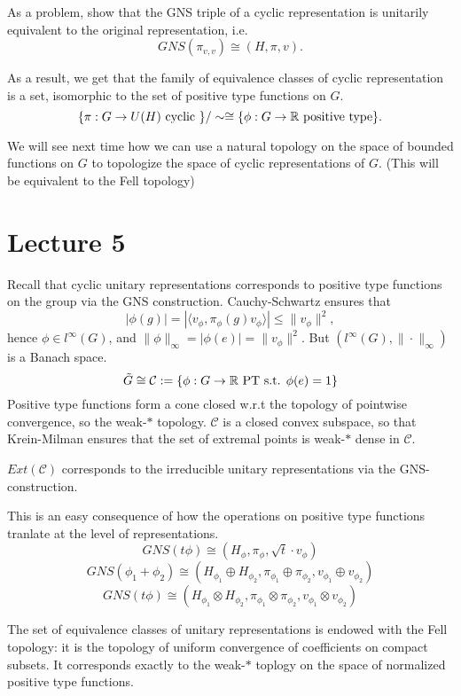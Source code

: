 As a problem, show that the GNS triple of a cyclic representation is unitarily equivalent to the original representation, i.e. 
\[GNS(\pi_{v,v}) \cong (H,\pi,v).\]  

As a result, we get that the family of equivalence classes of cyclic representation is a set, isomorphic to the set of positive type functions on $G$.
\[\{ \pi: G\rightarrow U(H) \text{ cyclic } \} / \sim \cong \{\phi : G \rightarrow \mathbb R \text{ positive type}\}.\] 

We will see next time how we can use a natural topology on the space of bounded functions on $G$ to topologize the space of cyclic representations of $G$. (This will be equivalent to the Fell topology)

\section{Lecture 5}
Recall that cyclic unitary representations corresponds to positive type functions on the group via the GNS construction. Cauchy-Schwartz ensures that
\[|\phi(g) | = |\langle v_\phi , \pi_\phi(g)v_\phi \rangle | \leq \|v_\phi \|^2,\]
hence $\phi\in l^\infty(G)$, and $\|\phi\|_\infty = |\phi(e)| =\|v_\phi \|^2$. But $(l^\infty(G), \|\cdot\|_\infty )$ is a Banach space. 
\[\tilde G\cong \mathcal C :=\{\phi: G\rightarrow \mathbb R \text{ PT s.t. }\phi(e) = 1\}\] 
Positive type functions form a cone closed w.r.t the topology of pointwise convergence, so the weak-$*$ topology. $\mathcal C$ is a closed convex subspace, so that Krein-Milman ensures that the set of extremal points is weak-$*$ dense in $\mathcal C$.

\begin{prop}
$Ext(\mathcal C)$ corresponds to the irreducible unitary representations via the GNS-construction.
\end{prop}  
 
This is an easy consequence of how the operations on positive type functions tranlate at the level of representations.
\[GNS(t\phi)\cong (H_\phi, \pi_\phi, \sqrt{t}\cdot v_\phi)\]
\[GNS(\phi_1+\phi_2)\cong (H_{\phi_1} \oplus H_{\phi_2}, \pi_{\phi_1}\oplus \pi_{\phi_2}, v_{\phi_1}\oplus v_{\phi_2})\]
\[GNS(t\phi)\cong (H_{\phi_1} \otimes H_{\phi_2}, \pi_{\phi_1}\otimes \pi_{\phi_2}, v_{\phi_1}\otimes v_{\phi_2})\]

The set of equivalence classes of unitary representations is endowed with the Fell topology: it is the topology of uniform convergence of coefficients on compact subsets. It corresponds exactly to the weak-$*$ toplogy on the space of normalized positive type functions.

